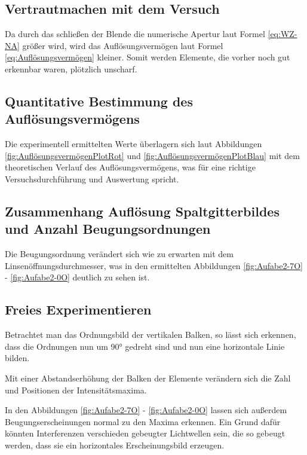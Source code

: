 \documentclass[12pt,a4paper,twoside]{article}
\begin{document}
\subsection{Vertrautmachen mit dem Versuch}

Da durch das schließen der Blende die numerische Apertur laut Formel \ref{eq:WZ-NA} größer wird, wird das Auflösungsvermögen laut Formel \ref{eq:Auflösungsvermögen} kleiner. Somit werden Elemente, die vorher noch gut erkennbar waren, plötzlich unscharf.


\subsection{Quantitative Bestimmung des Auflösungsvermögens}

Die experimentell ermittelten Werte überlagern sich laut Abbildungen \ref{fig:AuflösungsvermögenPlotRot} und \ref{fig:AuflösungsvermögenPlotBlau} mit dem theoretischen Verlauf des Auflösungsvermögens, was für eine richtige Versuchsdurchführung und Auswertung spricht.


\subsection{Zusammenhang Auflösung Spaltgitterbildes und Anzahl Beugungsordnungen}

Die Beugungsordnung verändert sich wie zu erwarten mit dem Linsenöffnungsdurchmesser, was in den ermittelten Abbildungen \ref{fig:Aufabe2-7O} - \ref{fig:Aufabe2-0O} deutlich zu sehen ist.


\subsection{Freies Experimentieren}

Betrachtet man das Ordnungsbild der vertikalen Balken, so lässt sich erkennen, dass die Ordnungen nun um 90° gedreht sind und nun eine horizontale Linie bilden. \newline

\noindent
Mit einer Abstandserhöhung der Balken der Elemente verändern sich die Zahl und Positionen der Intensitätsmaxima. \newline

\noindent
In den Abbildungen \ref{fig:Aufabe2-7O} - \ref{fig:Aufabe2-0O} lassen sich außerdem Beugungserscheinungen normal zu den Maxima erkennen. 
Ein Grund dafür könnten Interferenzen verschieden gebeugter Lichtwellen sein, die so gebeugt werden, dass sie ein horizontales Erscheinungsbild erzeugen.
\end{document}
